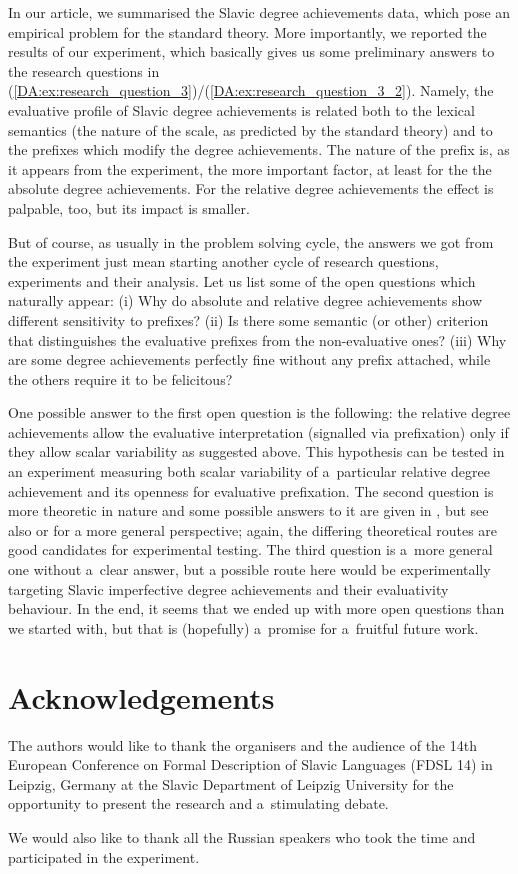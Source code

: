 \documentclass[output=paper]{langscibook}
\begin{document}
In our article, we summarised the Slavic degree achievements data, which pose an empirical problem for the standard theory. More importantly, we reported the results of our experiment, which basically gives us some preliminary answers to the research questions in (\ref{DA:ex:research_question_3})/(\ref{DA:ex:research_question_3_2}). Namely, the evaluative profile of Slavic degree achievements is related both to the lexical semantics (the nature of the scale, as predicted by the standard theory) and to the prefixes which modify the degree achievements. The nature of the prefix is, as it appears from the experiment, the more important factor, at least for the the absolute degree achievements. For the relative degree achievements the effect is palpable, too, but its impact is smaller. 

But of course, as usually in the problem solving cycle, the answers we got from the experiment just mean starting another cycle of research questions, experiments and their analysis. Let us list some of the open questions which naturally appear: (i) Why do absolute and relative degree achievements show different sensitivity to prefixes? (ii) Is there some semantic (or other) criterion that distinguishes the evaluative prefixes from the non-evaluative ones? (iii) Why are some degree achievements perfectly fine without any prefix attached, while the others require it to be felicitous?

One possible answer to the first open question is the following: the relative degree achievements allow the evaluative interpretation (signalled via prefixation) only if they allow scalar variability as suggested above. This hypothesis can be tested in an experiment measuring both scalar variability of a~particular relative degree achievement and its openness for evaluative prefixation. The second question is more theoretic in nature and some possible answers to it are given in \citet{DocekalVlaskova2021}, but see also \citet{Filip2008} or \citet{martinez_vera_degree_2021} for a more general perspective; again, the differing theoretical routes are good candidates for experimental testing. The third question is a~more general one without a~clear answer, but a possible route here would be experimentally targeting Slavic imperfective degree achievements and their evaluativity behaviour. In the end, it seems that we ended up with more open questions than we started with, but that is (hopefully) a~promise for a~fruitful future work. 

\section*{Acknowledgements}
The authors would like to thank the organisers and the audience of the 14th European Conference on Formal Description of Slavic Languages (FDSL 14) in Leipzig, Germany at the Slavic Department of Leipzig University for the opportunity to present the research and a~stimulating debate. 

We would also like to thank all the Russian speakers who took the time and participated in the experiment. 

\printbibliography[heading=subbibliography,notkeyword=this]
\end{document}

